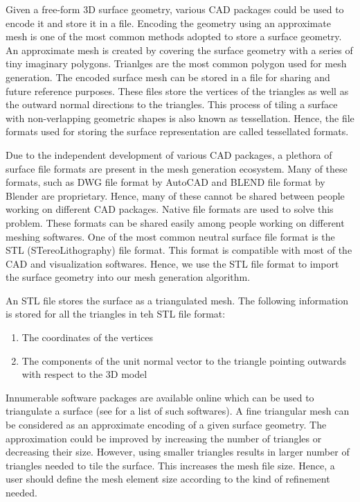 Given a free-form 3D surface geometry, various CAD packages could be used to encode it and store it in a file. Encoding the geometry using an approximate mesh is one of the most common methods adopted to store a surface geometry. An approximate mesh is created by covering the surface geometry with a series of tiny imaginary polygons. Trianlges are the most common polygon used for mesh generation. The encoded surface mesh can be stored in a file for sharing and future reference purposes. These files store the vertices of the triangles as well as the outward normal directions to the triangles. This process of tiling a surface with non-verlapping geometric shapes is also known as tessellation. Hence, the file formats used for storing the surface representation are called tessellated formats.

Due to the independent development of various CAD packages, a plethora of surface file formats are present in the mesh generation ecosystem. Many of these formats, such as DWG file format by AutoCAD and BLEND file format by Blender are proprietary. Hence, many of these cannot be shared between people working on different CAD packages. Native file formats are used to solve this problem. These formats can be shared easily among people working on different meshing softwares. One of the most common neutral surface file format is the STL (STereoLithography) file format. This format is compatible with most of the CAD and visualization softwares. Hence, we use the STL file format to import the surface geometry into our mesh generation algorithm.

An STL file stores the surface as a triangulated mesh. The following information is stored for all the triangles in teh STL file format:

\begin{enumerate}
  \item The coordinates of the vertices
  \item The components of the unit normal vector to the triangle pointing outwards with respect to the 3D model
\end{enumerate}

Innumerable software packages are available online which can be used to triangulate a surface (see \cite{meshSoftware} for a list of such softwares). A fine triangular mesh can be considered as an approximate encoding of a given surface geometry. The approximation could be improved by increasing the number of triangles or decreasing their size. However, using smaller triangles results in larger number of triangles needed to tile the surface. This increases the mesh file size. Hence, a user should define the mesh element size according to the kind of refinement needed.

